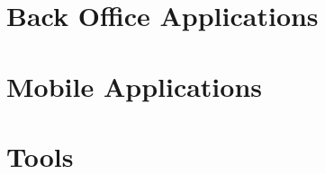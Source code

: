 
\newcommand*{\impl}{chapters/implementation/}


\section{Back Office Applications}
	
\section{Mobile Applications}
	
\section{Tools}
	
